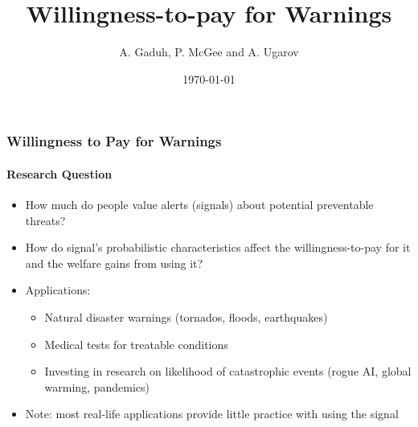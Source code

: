 \documentclass[11pt,hyperref={bookmarks=false}]{beamer}
\title[Willingness-to-pay for Warnings]{Willingness-to-pay for Warnings}
\author[A. Gaduh, P. McGee and A. Ugarov]{A. Gaduh, P. McGee and A. Ugarov}
\institute[]{}
\date{\today}
\newcommand\BackgroundPic{%
\put(0,0){%
\parbox[b][\paperheight]{\paperwidth}{%
\vfill
\centering
\vfill
}}}
\begin{document}

\begin{frame}
\titlepage
\end{frame}





\begin{frame}
\frametitle{Willingness to Pay for Warnings}
\framesubtitle{Research Question}
\begin{itemize}
	\item How much do people value alerts (signals) about potential preventable threats?
	\item How do signal's probabilistic characteristics affect the willingness-to-pay for it and the welfare gains from using it?
	\item Applications:
	\begin{itemize}
		\item Natural disaster warnings (tornados, floods, earthquakes)
		\item Medical tests for treatable conditions
		\item Investing in research on likelihood of catastrophic events (rogue AI, global warming, pandemics)
	\end{itemize}
	\item Note: most real-life applications provide little practice with using the signal
\end{itemize}
\end{frame}
\end{document}
